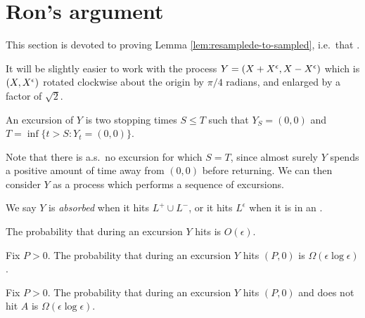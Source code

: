 {
\section{Ron's argument}

\newcommand{\bandwidth}{\delta}
\newcommand{\rotproc}{Y}

\newcommand{\union}{\cup}
\renewcommand{\L}{L^+ \union L^-}
\newcommand{\Le}{L^\epsilon}

This section is devoted to proving Lemma
\ref{lem:resamplede-to-sampled}, i.e.\ that
\statementoflemresampledetosampled.

It will be slightly easier to work with the process $\rotproc =
(\sampled + \resamplede, \sampled - \resamplede)$ which is $(X,
X^{\epsilon})$ rotated clockwise about the origin by $\pi / 4$ radians, and enlarged by a factor of
$\sqrt{2}$.

\newcommand{\boundarylines}{A}
\newcommand{\farpoint}{(P,0)}
\newcommand{\origin}{(0,0)}

\begin{definition}
  An excursion of $Y$ is two stopping times $S \le T$ such that $Y_S =
  \origin$ and $T = \inf\{ t > S : Y_t = \origin \}$.
\end{definition}

Note that there is a.s.\ no excursion for which $S = T$, since almost
surely $Y$ spends a positive amount of time away from $\origin$ before
returning.  We can then consider $Y$ as a process which performs a
sequence of excursions.

\begin{definition}
  We say $Y$ is \emph{absorbed} when it hits $\L$, or it hits $\Le$
  when it is in an .
\end{definition}

\begin{lemma}
  \label{lem:Phitboundaryline}
  The probability that during an excursion $Y$ hits \FIXME{$\boundarylines$}{define this}
  is $O(\epsilon)$.
\end{lemma}

\newcommand{\Omegaeloge}{\Omega(\epsilon\log\epsilon)}

\begin{lemma}
  \label{lem:Pabsorbedandtravelsfar}
  Fix $P > 0$.  The probability that during an excursion $Y$ hits $\farpoint$
  is $\Omegaeloge$.
\end{lemma}

\begin{lemma}
  Fix $P > 0$.  The probability that during an excursion $Y$ hits $\farpoint$
  and does not hit $A$ is $\Omegaeloge$.
\end{lemma}

}
